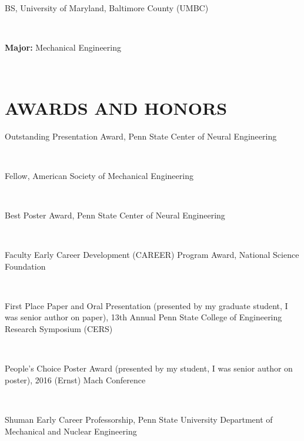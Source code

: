\documentclass[a4paper,10pt]{article}
\begin{document}
            \noindent \parbox[t]{0.8\linewidth}{\raggedright BS, University of Maryland,  Baltimore County (UMBC)} \hfill \parbox[t]{0.2\linewidth}{} \\
            \noindent \parbox[t]{0.8\linewidth}{\raggedright \textbf{Major:} Mechanical Engineering} \\
            

    \section*{AWARDS AND HONORS}
    
        \noindent \parbox[t]{0.8\linewidth}{\raggedright Outstanding Presentation Award, Penn State Center of Neural Engineering} \hfill \parbox[t]{0.2\linewidth}{} \\
        
        \noindent \parbox[t]{0.8\linewidth}{\raggedright Fellow, American Society of Mechanical Engineering} \hfill \parbox[t]{0.2\linewidth}{} \\
        
        \noindent \parbox[t]{0.8\linewidth}{\raggedright Best Poster Award, Penn State Center of Neural Engineering} \hfill \parbox[t]{0.2\linewidth}{} \\
        
        \noindent \parbox[t]{0.8\linewidth}{\raggedright Faculty Early Career Development (CAREER) Program Award, National Science Foundation} \hfill \parbox[t]{0.2\linewidth}{} \\
        
        \noindent \parbox[t]{0.8\linewidth}{\raggedright First Place Paper and Oral Presentation (presented by my graduate student, I was senior author on paper), 13th Annual Penn State College of Engineering Research Symposium (CERS)} \hfill \parbox[t]{0.2\linewidth}{} \\
        
        \noindent \parbox[t]{0.8\linewidth}{\raggedright People's Choice Poster Award (presented by my student, I was senior author on poster), 2016 (Ernst) Mach Conference} \hfill \parbox[t]{0.2\linewidth}{} \\
        
        \noindent \parbox[t]{0.8\linewidth}{\raggedright Shuman Early Career Professorship, Penn State University Department of Mechanical and Nuclear Engineering} \hfill \parbox[t]{0.2\linewidth}{} \\
        
\end{document}

